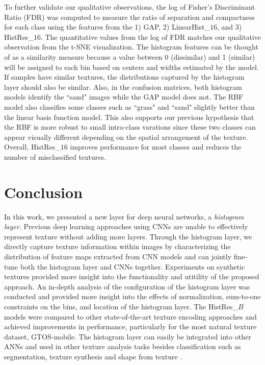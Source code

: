 \documentclass[journal]{IEEEtai}
\begin{document}
	To further validate our qualitative observations, the log of Fisher's Discriminant Ratio (FDR) \cite{bishop2006pattern} was computed to measure the ratio of separation and compactness for each class using the features from the 1) GAP, 2) LinearHist\_$16$, and 3) HistRes\_$16$. The quantitative values from the log of FDR matches our qualitative observation from the t-SNE visualization. The histogram features can be thought of as a similarity measure because a value between 0 (dissimilar) and 1 (similar) will be assigned to each bin based on centers and widths estimated by the model. If samples have similar textures, the distributions captured by the histogram layer should also be similar. Also, in the confusion matrices, both histogram models identify the ``sand" images while the GAP model does not. The RBF model also classifies some classes such as ``grass" and ``sand" slightly better than the linear basis function model. This also supports our previous hypothesis that the RBF is more robust to small intra-class varations since these two classes can appear visually different depending on the spatial arrangement of the texture. Overall, HistRes\_$16$ improves performance for most classes and reduces the number of misclassified textures. 
	
	\section{Conclusion}
	In this work, we presented a new layer for deep neural networks, a \textit{histogram layer}. Previous deep learning approaches using CNNs are unable to effectively represent texture without adding more layers. Through the histogram layer, we directly capture texture information within images by characterizing the distribution of feature maps extracted from CNN models and can jointly fine-tune both the histogram layer and CNNs together. Experiments on synthetic textures provided more insight into the functionality and utitility of the proposed approach. An in-depth analysis of the configuration of the histogram layer was conducted and provided more insight into the effects of normalization, sum-to-one constraints on the bins, and location of the histogram layer. The HistRes\_$B$ models were compared to other state-of-the-art texture encoding approaches and achieved improvements in performance, particularly for the most natural texture dataset, GTOS-mobile. The histogram layer can easily be integrated into other ANNs and used in other texture analysis tasks besides classification such as segmentation, texture synthesis and shape from texture \cite{liu2019bow}.
\end{document}
